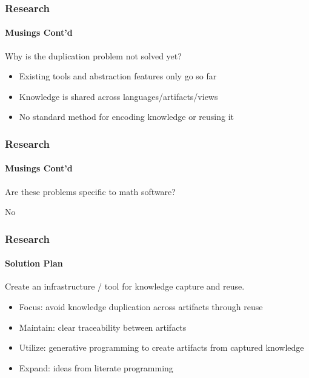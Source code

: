 \documentclass{beamer}
\begin{document}
\begin{frame}

\frametitle{Research}
\framesubtitle{Musings Cont'd}

Why is the duplication problem not solved yet? 

\begin{itemize}
\item Existing tools and abstraction features only go so far
\item Knowledge is shared across languages/artifacts/views

\item No standard method for encoding knowledge or reusing it
\end{itemize}

\end{frame}

\begin{frame}

\frametitle{Research}
\framesubtitle{Musings Cont'd}

Are these problems specific to math software?

\Huge{No}

\end{frame}



\begin{frame}

\frametitle{Research}
\framesubtitle{Solution Plan}

Create an infrastructure / tool for knowledge capture and reuse.

\begin{itemize}
\item Focus: avoid knowledge duplication across artifacts through reuse%
\item Maintain: clear traceability between artifacts
\item Utilize: generative programming to create artifacts from captured
	knowledge
\item Expand: ideas from literate programming

\end{itemize}
\end{frame}
\end{document}
